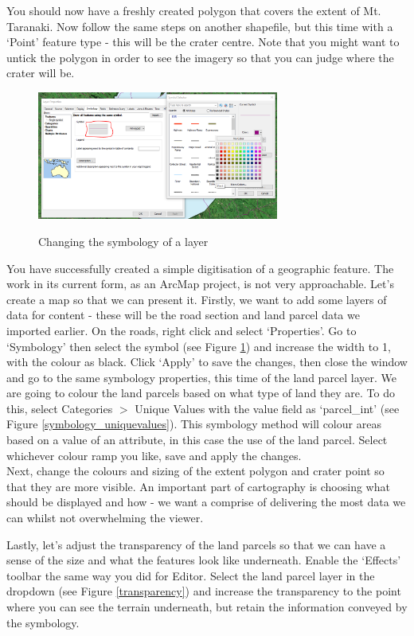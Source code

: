 \documentclass{article}
\begin{document}
You should now have a freshly created polygon that covers the extent of Mt. Taranaki. Now follow the same steps on another shapefile, but this time with a `Point' feature type - this will be the crater centre. Note that you might want to untick the polygon in order to see the imagery so that you can judge where the crater will be.\\

\begin{figure}[h]
    \centering
    \caption{Changing the symbology of a layer}
    \includegraphics[width=300px]{images/part1/symbology}
    \label{symbology}
\end{figure}

You have successfully created a simple digitisation of a geographic feature. The work in its current form, as an ArcMap project, is not very approachable. Let's create a map so that we can present it. Firstly, we want to add some layers of data for content - these will be the road section and land parcel data we imported earlier. On the roads, right click and select `Properties'. Go to `Symbology' then select the symbol (see Figure \ref{symbology}) and increase the width to 1, with the colour as black. Click `Apply' to save the changes, then close the window and go to the same symbology properties, this time of the land parcel layer. We are going to colour the land parcels based on what type of land they are. To do this, select Categories $>$ Unique Values with the value field as `parcel\_int' (see Figure \ref{symbology_uniquevalues}). This symbology method will colour areas based on a value of an attribute, in this case the use of the land parcel. Select whichever colour ramp you like, save and apply the changes.\\

Next, change the colours and sizing of the extent polygon and crater point so that they are more visible. An important part of cartography is choosing what should be displayed and how - we want a comprise of delivering the most data we can whilst not overwhelming the viewer.
\pagebreak

Lastly, let's adjust the transparency of the land parcels so that we can have a sense of the size and what the features look like underneath. Enable the `Effects' toolbar the same way you did for Editor. Select the land parcel layer in the dropdown (see Figure \ref{transparency}) and increase the transparency to the point where you can see the terrain underneath, but retain the information conveyed by the symbology.\\
\end{document}
